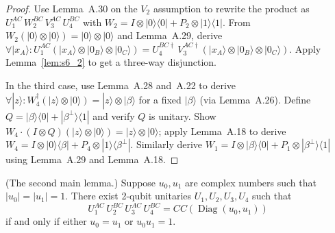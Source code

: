\begin{proof}
  \leanok
  Use Lemma~A.30 on the $V_2$ assumption to rewrite the product as
  $U_1^{AC}\, W_2^{BC}\, V_3^{AC}\, U_4^{BC}$
  with $W_2 = I \otimes |0\rangle\langle 0| + P_2 \otimes |1\rangle\langle 1|$.
  From $W_2(|0\rangle \otimes |0\rangle) = |0\rangle \otimes |0\rangle$ and
  Lemma~A.29, derive
  $\forall |x_A\rangle :
   U_1^{AC}(|x_A\rangle \otimes |0_B\rangle \otimes |0_C\rangle)
   = U_4^{BC\dagger}\, V_3^{AC\dagger}(|x_A\rangle \otimes |0_B\rangle \otimes |0_C\rangle)$.
  Apply Lemma~\ref{lem:s6_2} to get a three-way disjunction.

  In the third case, use Lemma~A.28 and~A.22 to derive
  $\forall |z\rangle : W_4^\dagger(|z\rangle \otimes |0\rangle) = |z\rangle \otimes |\beta\rangle$
  for a fixed $|\beta\rangle$ (via Lemma~A.26).
  Define $Q = |\beta\rangle\langle 0| + |\beta^\perp\rangle\langle 1|$
  and verify $Q$ is unitary.
  Show $W_4 \cdot (I \otimes Q)(|z\rangle \otimes |0\rangle) = |z\rangle \otimes |0\rangle$;
  apply Lemma~A.18 to derive
  $W_4 = I \otimes |0\rangle\langle\beta| + P_4 \otimes |1\rangle\langle\beta^\perp|$.
  Similarly derive
  $W_1 = I \otimes |\beta\rangle\langle 0| + P_1 \otimes |\beta^\perp\rangle\langle 1|$
  using Lemma~A.29 and Lemma~A.18.
\end{proof}

\begin{lemma}
  \label{lem:s6_4}
  \leanok
  (The second main lemma.)
  Suppose $u_0, u_1$ are complex numbers such that $|u_0| = |u_1| = 1$.
  There exist 2-qubit unitaries $U_1, U_2, U_3, U_4$ such that
  \[
    U_1^{AC}\, U_2^{BC}\, U_3^{AC}\, U_4^{BC} = CC(\operatorname{Diag}(u_0, u_1))
  \]
  if and only if either $u_0 = u_1$ or $u_0 u_1 = 1$.
\end{lemma}

